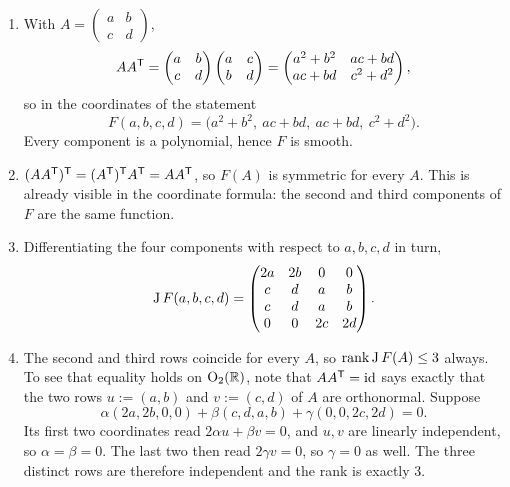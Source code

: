 \begin{exercisesolution}
\label{sol:orthogonal_group_submanifold}
\begin{enumerate}[label=\textbf{(\alph*)}]
  \item With $A = \left(\begin{smallmatrix} a & b \\ c & d\end{smallmatrix}\right)$,
\[AA^{\mathsf{T}} = \begin{pmatrix} a & b \\ c & d \end{pmatrix}
              \begin{pmatrix} a & c \\ b & d \end{pmatrix}
            = \begin{pmatrix} a^2+b^2 & ac+bd \\ ac+bd & c^2+d^2 \end{pmatrix},\]
    so in the coordinates of the statement
\[F(a,b,c,d) = \big(a^2+b^2,\ ac+bd,\ ac+bd,\ c^2+d^2\big).\]
    Every component is a polynomial, hence $F$ is smooth.

  \item $(AA^{\mathsf{T}})^{\mathsf{T}} = (A^{\mathsf{T}})^{\mathsf{T}} A^{\mathsf{T}} = AA^{\mathsf{T}}$, so $F(A)$ is symmetric for
    every $A$. This is already visible in the coordinate formula: the second and third components
    of $F$ are the same function.

  \item Differentiating the four components with respect to $a,b,c,d$ in turn,
\[\operatorname{J} F(a,b,c,d) = \begin{pmatrix}
  2a & 2b & 0 & 0 \\
  c & d & a & b \\
  c & d & a & b \\
  0 & 0 & 2c & 2d
\end{pmatrix}.\]

  \item The second and third rows coincide for every $A$, so $\operatorname{rank} \operatorname{J} F(A) \le 3$ always. To see
    that equality holds on $\operatorname{O}_2(\mathbb{R})$, note that $AA^{\mathsf{T}} = \operatorname{id}$ says exactly that the
    two rows $u := (a,b)$ and $v := (c,d)$ of $A$ are orthonormal. Suppose
\[\alpha(2a,2b,0,0) + \beta(c,d,a,b) + \gamma(0,0,2c,2d) = 0.\]
    Its first two coordinates read $2\alpha u + \beta v = 0$, and $u,v$ are linearly independent,
    so $\alpha = \beta = 0$. The last two then read $2\gamma v = 0$, so $\gamma = 0$ as well. The
    three distinct rows are therefore independent and the rank is exactly $3$.


\end{enumerate}
\end{exercisesolution}
